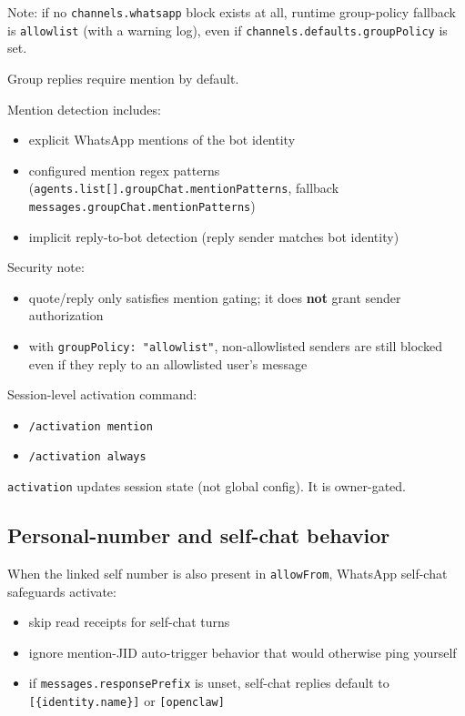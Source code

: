 Note: if no \texttt{channels.whatsapp} block exists at all, runtime group-policy fallback is \texttt{allowlist} (with a warning log), even if \texttt{channels.defaults.groupPolicy} is set.


Group replies require mention by default.

Mention detection includes:

\begin{itemize}
  \item explicit WhatsApp mentions of the bot identity
  \item configured mention regex patterns (\texttt{agents.list[].groupChat.mentionPatterns}, fallback \texttt{messages.groupChat.mentionPatterns})
  \item implicit reply-to-bot detection (reply sender matches bot identity)
\end{itemize}


Security note:

\begin{itemize}
  \item quote/reply only satisfies mention gating; it does \textbf{not} grant sender authorization
  \item with \texttt{groupPolicy: "allowlist"}, non-allowlisted senders are still blocked even if they reply to an allowlisted user's message
\end{itemize}


Session-level activation command:

\begin{itemize}
  \item \texttt{/activation mention}
  \item \texttt{/activation always}
\end{itemize}


\texttt{activation} updates session state (not global config). It is owner-gated.


\subsection{Personal-number and self-chat behavior}


When the linked self number is also present in \texttt{allowFrom}, WhatsApp self-chat safeguards activate:

\begin{itemize}
  \item skip read receipts for self-chat turns
  \item ignore mention-JID auto-trigger behavior that would otherwise ping yourself
  \item if \texttt{messages.responsePrefix} is unset, self-chat replies default to \texttt{[\{identity.name\}]} or \texttt{[openclaw]}
\end{itemize}


